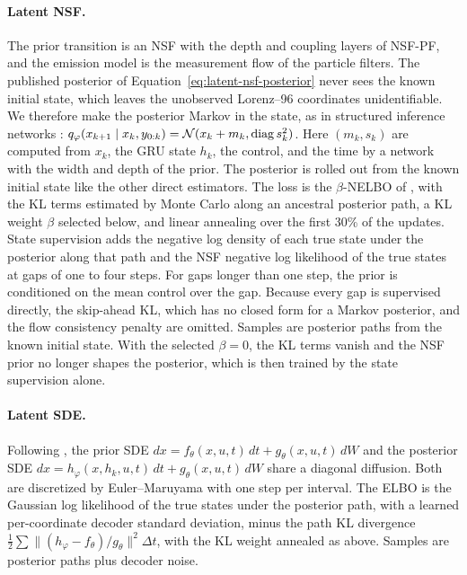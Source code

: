 \paragraph{Latent NSF.} The prior transition is an NSF with the depth and coupling layers of NSF-PF, and the emission model is the measurement flow of the particle filters. The published posterior of Equation~\eqref{eq:latent-nsf-posterior} never sees the known initial state, which leaves the unobserved Lorenz--96 coordinates unidentifiable. We therefore make the posterior Markov in the state, as in structured inference networks \citep{krishnan2017structured}: $q_\varphi(x_{k+1}\mid x_k,y_{0:k})=\mathcal N(x_k+m_k,\mathrm{diag}\,s_k^2)$. Here $(m_k,s_k)$ are computed from $x_k$, the GRU state $h_k$, the control, and the time by a network with the width and depth of the prior. The posterior is rolled out from the known initial state like the other direct estimators. The loss is the $\beta$-NELBO of \citet[Equation~16]{kiyohara2025nsf}, with the KL terms estimated by Monte Carlo along an ancestral posterior path, a KL weight $\beta$ selected below, and linear annealing over the first 30\% of the updates. State supervision adds the negative log density of each true state under the posterior along that path and the NSF negative log likelihood of the true states at gaps of one to four steps. For gaps longer than one step, the prior is conditioned on the mean control over the gap. Because every gap is supervised directly, the skip-ahead KL, which has no closed form for a Markov posterior, and the flow consistency penalty are omitted. Samples are posterior paths from the known initial state. With the selected $\beta=0$, the KL terms vanish and the NSF prior no longer shapes the posterior, which is then trained by the state supervision alone.

\paragraph{Latent SDE.} Following \citet{li2020scalable}, the prior SDE $dx=f_\theta(x,u,t)\,dt+g_\theta(x,u,t)\,dW$ and the posterior SDE $dx=h_\varphi(x,h_k,u,t)\,dt+g_\theta(x,u,t)\,dW$ share a diagonal diffusion. Both are discretized by Euler--Maruyama with one step per interval. The ELBO is the Gaussian log likelihood of the true states under the posterior path, with a learned per-coordinate decoder standard deviation, minus the path KL divergence $\tfrac12\sum\|(h_\varphi-f_\theta)/g_\theta\|^2\Delta t$, with the KL weight annealed as above. Samples are posterior paths plus decoder noise.

